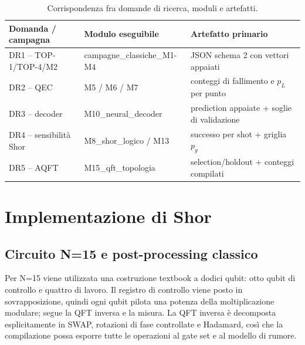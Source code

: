 \begingroup
\small
\begin{table}[!htbp]
\centering
\small

\begin{tabular}{@{}
  >{\raggedright\arraybackslash}p{}
  >{\raggedright\arraybackslash}p{}
  >{\raggedright\arraybackslash}p{}@{}}
\toprule
\textbf{Domanda / campagna} & \textbf{Modulo eseguibile} & \textbf{Artefatto primario} \\
\midrule
DR1 -- TOP-1/TOP-4/M2 & campagne\_\allowbreak{}classiche\_\allowbreak{}M1-M4 & JSON schema 2 con vettori appaiati \\
\addlinespace[0.3em]
DR2 -- QEC & M5 / M6 / M7 & conteggi di fallimento e $p_L$ per punto \\
\addlinespace[0.3em]
DR3 -- decoder & M10\_\allowbreak{}neural\_\allowbreak{}decoder & prediction appaiate + soglie di validazione \\
\addlinespace[0.3em]
DR4 -- sensibilità Shor & M8\_\allowbreak{}shor\_\allowbreak{}logico / M13 & successo per shot + griglia $p_g$ \\
\addlinespace[0.3em]
DR5 -- AQFT & M15\_\allowbreak{}qft\_\allowbreak{}topologia & selection/\allowbreak{}holdout + conteggi compilati \\
\bottomrule
\end{tabular}
\caption{Corrispondenza fra domande di ricerca, moduli e artefatti.}\label{tab:finale_4_2}

\end{table}
\endgroup

\section{Implementazione di Shor}\label{sec:finale_4_3}

\subsection{Circuito N=15 e post-processing classico}\label{sec:finale_4_3_1}

Per N=15 viene utilizzata una costruzione textbook a dodici qubit: otto qubit di controllo e quattro di lavoro. Il registro di controllo viene posto in sovrapposizione, quindi ogni qubit pilota una potenza della moltiplicazione modulare; segue la QFT inversa e la misura. La QFT inversa è decomposta esplicitamente in SWAP, rotazioni di fase controllate e Hadamard, così che la compilazione possa esporre tutte le operazioni al gate set e al modello di rumore.

